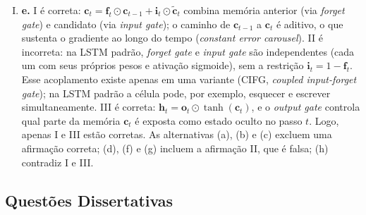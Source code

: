\documentclass{dlproblemset}
\begin{document}
\begin{enumerate}[I)]
    \item \textbf{e.} I é correta: $\mathbf{c}_t = \mathbf{f}_t \odot \mathbf{c}_{t-1} + \mathbf{i}_t \odot \tilde{\mathbf{c}}_t$ combina memória anterior (via \textit{forget gate}) e candidato (via \textit{input gate}); o caminho de $\mathbf{c}_{t-1}$ a $\mathbf{c}_t$ é aditivo, o que sustenta o gradiente ao longo do tempo (\textit{constant error carousel}). II é incorreta: na LSTM padrão, \textit{forget gate} e \textit{input gate} são independentes (cada um com seus próprios pesos e ativação sigmoide), sem a restrição $\mathbf{i}_t = 1 - \mathbf{f}_t$. Esse acoplamento existe apenas em uma variante (CIFG, \textit{coupled input-forget gate}); na LSTM padrão a célula pode, por exemplo, esquecer e escrever simultaneamente. III é correta: $\mathbf{h}_t = \mathbf{o}_t \odot \tanh(\mathbf{c}_t)$, e o \textit{output gate} controla qual parte da memória $\mathbf{c}_t$ é exposta como estado oculto no passo $t$. Logo, apenas I e III estão corretas. As alternativas (a), (b) e (c) excluem uma afirmação correta; (d), (f) e (g) incluem a afirmação II, que é falsa; (h) contradiz I e III.
\end{enumerate}
\color{black}

\newpage

\subsection*{Questões Dissertativas}
\end{document}
